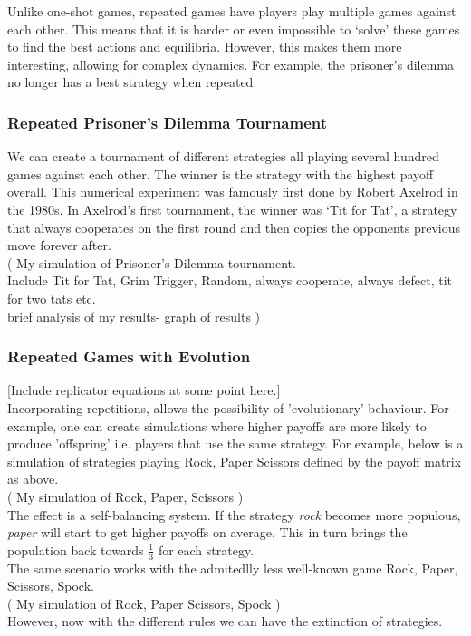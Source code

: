 Unlike one-shot games, repeated games have players play multiple games against each other. This means that it is harder or even impossible to `solve' these games to find the best actions and equilibria. However, this makes them more interesting, allowing for complex dynamics. For example, the prisoner's dilemma no longer has a best strategy when repeated.
\subsubsection{Repeated Prisoner's Dilemma Tournament}
We can create a tournament of different strategies all playing several hundred games against each other. The winner is the strategy with the highest payoff overall. This numerical experiment was famously first done by Robert Axelrod\cite{axelrod} in the 1980s. In Axelrod's first tournament, the winner was `Tit for Tat', a strategy that always cooperates on the first round and then copies the opponents previous move forever after.\\
(
My simulation of Prisoner's Dilemma tournament.\\
Include Tit for Tat, Grim Trigger, Random, always cooperate, always defect, tit for two tats etc.\\
brief analysis of my results- graph of results
)

\subsubsection{Repeated Games with Evolution}
[Include replicator equations at some point here.]\\
Incorporating repetitions, allows the possibility of 'evolutionary' behaviour. For example, one can create simulations where higher payoffs are more likely to produce 'offspring' i.e. players that use the same strategy. For example, below is a simulation of strategies playing Rock, Paper Scissors defined by the payoff matrix as above.\\
(
My simulation of Rock, Paper, Scissors
)\\
The effect is a self-balancing system. If the strategy \textit{rock} becomes more populous, \textit{paper} will start to get higher payoffs on average. This in turn brings the population back towards $\frac{1}{3}$ for each strategy.\\
The same scenario works with the admitedlly less well-known game Rock, Paper, Scissors, Spock\cite{for game}\cite{for code}.\\
(
My simulation of Rock, Paper Scissors, Spock
)\\
However, now with the different rules we can have the extinction of strategies.
